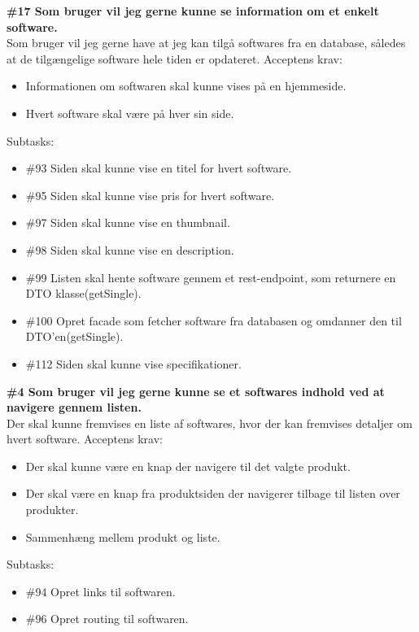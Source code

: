 \documentclass[11pt]{report}
\begin{document}
\noindent\textbf{\#17 Som bruger vil jeg gerne kunne se information om et enkelt software.}\\
\noindent Som bruger vil jeg gerne have at jeg kan tilgå softwares fra en database, således at de tilgængelige software hele tiden er opdateret.
\noindent Acceptens krav:
\begin{itemize}[topsep=0pt, partopsep=0pt]
  \item Informationen om softwaren skal kunne vises på en hjemmeside.
  \item Hvert software skal være på hver sin side.
\end{itemize}
\noindent Subtasks:
\begin{itemize}[topsep=0pt, partopsep=0pt]
  \item \#93 Siden skal kunne vise en titel for hvert software.
  \item \#95 Siden skal kunne vise pris for hvert software.
  \item \#97 Siden skal kunne vise en thumbnail.
  \item \#98 Siden skal kunne vise en description.
  \item \#99 Listen skal hente software gennem et rest-endpoint, som returnere en DTO klasse(getSingle).
  \item \#100 Opret facade som fetcher software fra databasen og omdanner den til DTO’en(getSingle).
  \item \#112 Siden skal kunne vise specifikationer.
\end{itemize}

\noindent\textbf{\#4 Som bruger vil jeg gerne kunne se et softwares indhold ved at navigere gennem listen.}\\
\noindent Der skal kunne fremvises en liste af softwares, hvor der kan fremvises detaljer om hvert software.
\noindent Acceptens krav:
\begin{itemize}[topsep=0pt, partopsep=0pt]
  \item Der skal kunne være en knap der navigere til det valgte produkt.
  \item Der skal være en knap fra produktsiden der navigerer tilbage til listen over produkter.
  \item Sammenhæng mellem produkt og liste.
\end{itemize}
\noindent Subtasks:
\begin{itemize}[topsep=0pt, partopsep=0pt]
  \item \#94 Opret links til softwaren.
  \item \#96 Opret routing til softwaren.
\end{itemize}
\end{document}
